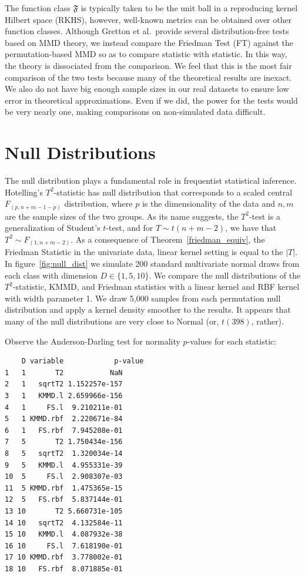 The function class $\mathfrak{F}$ is typically taken to be the unit ball in a
reproducing kernel Hilbert space (RKHS), however, well-known metrics
can be obtained over other function classes.  Although Gretton et
al.\ provide several distribution-free tests based on MMD theory, we
instead compare the Friedman Test (FT) against the permutation-based
MMD so as to compare statistic with statistic.  In this way, the
theory is dissociated from the comparison.  We feel that this is the
most fair comparison of the two tests because many of the theoretical
results are inexact.  We also do not have big enough sample sizes in
our real datasets to ensure low error in theoretical approximations.
Even if we did, the power for the tests would be very nearly one,
making comparisons on non-simulated data difficult.

\section{Null Distributions}
The null distribution plays a fundamental role in frequentist statistical
inference.  Hotelling's $T^2$-statistic has null distribution that
corresponds to a scaled central $F_{(p, n+m-1-p)}$ distribution, where
$p$ is the dimensionality of the data and $n, m$ are the sample sizes
of the two groups.  As its name suggests, the $T^2$-test is a
generalization of Student's $t$-test, and for $T \sim t(n+m-2)$, we
have that $T^2 \sim F_{(1, n+m-2)}$.  As a consequence of
Theorem~\ref{friedman_equiv}, the Friedman Statistic in the univariate
data, linear kernel setting is equal to the $|T|$.  In figure~\ref{fig:null_dist} we simulate
200 standard multivariate normal draws from each class with dimension
$D \in \{1, 5, 10\}$.  We compare the null distributions of the
$T^2$-statistic, KMMD, and Friedman statistics with a linear kernel
and RBF kernel with width parameter 1.  We draw 5,000 samples from
each permutation null distribution and apply a kernel density smoother
to the results.  It appears that many of the null distributions are
very close to Normal (or, $t(398)$, rather).  

Observe the Anderson-Darling test for normality $p$-values for each
statistic:
\begin{verbatim}
    D variable            p-value
1   1       T2           NaN
2   1   sqrtT2 1.152257e-157
3   1   KMMD.l 2.659966e-156
4   1     FS.l  9.210211e-01
5   1 KMMD.rbf  2.220671e-84
6   1   FS.rbf  7.945208e-01
7   5       T2 1.750434e-156
8   5   sqrtT2  1.320034e-14
9   5   KMMD.l  4.955331e-39
10  5     FS.l  2.908307e-03
11  5 KMMD.rbf  1.475365e-15
12  5   FS.rbf  5.837144e-01
13 10       T2 5.660731e-105
14 10   sqrtT2  4.132584e-11
15 10   KMMD.l  4.087932e-38
16 10     FS.l  7.618190e-01
17 10 KMMD.rbf  3.778002e-01
18 10   FS.rbf  8.071885e-01
\end{verbatim}


